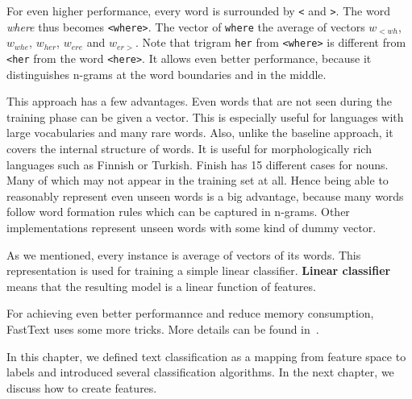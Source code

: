 For even higher performance,  every word is surrounded by \texttt{<} and \texttt{>}.
The word \textit{ where} thus becomes \texttt{<where>}.
The vector of \texttt{where}  the average of  vectors
$w_{<wh}$, 
$w_{whe}$, 
$w_{her}$,
$w_{ere}$ and
$w_{er>}$.
Note that trigram {\tt her} from \texttt{<where>} is different from {\tt <her} from the word {\tt <here>}.
It allows even better performance, because it distinguishes n-grams at the word boundaries and in the middle.

This approach has a few advantages.
Even words that are not seen during the training phase can be given a vector.
This is especially useful for languages with large vocabularies and many rare words.
Also, unlike the baseline approach, it covers the internal structure of words.
It is useful for morphologically rich languages such as Finnish or Turkish.
Finish has 15 different cases for nouns.
Many of which may not appear in the training set at all.
Hence being able to reasonably represent even unseen words is a big advantage,
because many words follow word formation rules which can be captured in n-grams.
Other implementations represent unseen words with some kind of dummy vector.

As we mentioned, every instance is average of vectors of its words.
This representation is used for training a simple linear classifier.
\textbf{Linear classifier} means that the resulting model is a linear function
of features.

For achieving even better performannce and reduce memory consumption, FastText uses some more tricks.
More details can be found in~\citet{Joulin2017bag}.


In this chapter, we defined text classification as a mapping from feature space to labels
and introduced several classification algorithms.
In the next chapter, we discuss how to create features.
